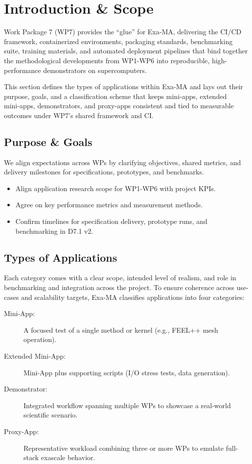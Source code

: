 
\section{Introduction \& Scope}
\label{sec:apps-intro}

Work Package 7 (WP7) provides the “glue” for Exa-MA, delivering the CI/CD framework, containerized environments, packaging standards, benchmarking suite, training materials, and automated deployment pipelines that bind together the methodological developments from WP1-WP6 into reproducible, high-performance demonstrators on supercomputers.

This section defines the types of applications within Exa-MA and lays out their purpose, goals, and a classification scheme that keeps mini‑apps, extended mini‑apps, demonstrators, and proxy‑apps consistent and tied to measurable outcomes under WP7’s shared framework and CI.

\subsection{Purpose \& Goals}
We align expectations across WPs by clarifying objectives, shared metrics, and delivery milestones for specifications, prototypes, and benchmarks.
\begin{itemize}
  \item Align application research scope for WP1-WP6 with project KPIs.
  \item Agree on key performance metrics and measurement methods.
  \item Confirm timelines for specification delivery, prototype runs, and benchmarking in D7.1 v2.
\end{itemize}

\subsection{Types of Applications}
Each category comes with a clear scope, intended level of realism, and role in benchmarking and integration across the project.
To ensure coherence across use-cases and scalability targets, Exa-MA classifies applications into four categories:
\begin{description}
  \item[Mini-App:] A focused test of a single method or kernel (e.g., FEEL++ mesh operation).
  \item[Extended Mini-App:] Mini-App plus supporting scripts (I/O stress tests, data generation).
  \item[Demonstrator:] Integrated workflow spanning multiple WPs to showcase a real-world scientific scenario.
  \item[Proxy-App:] Representative workload combining three or more WPs to emulate full-stack exascale behavior.
\end{description}
